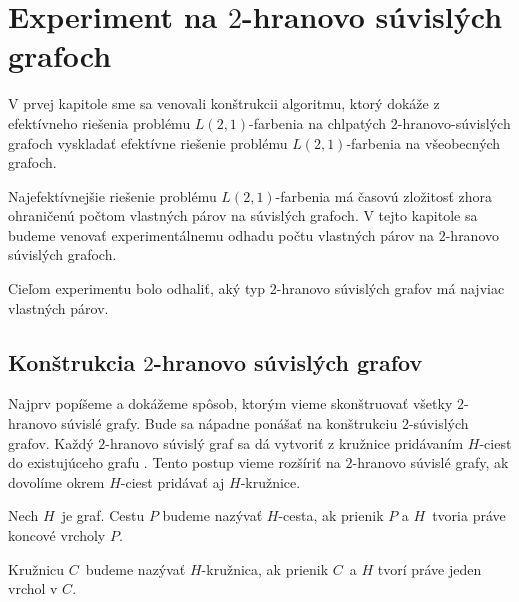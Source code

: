\chapter{Experiment na $2$-hranovo súvislých grafoch}

V prvej kapitole sme sa venovali konštrukcii algoritmu, ktorý dokáže z efektívneho riešenia
problému $L(2,1)$-farbenia na chlpatých $2$-hranovo-súvislých grafoch vyskladať efektívne
riešenie problému $L(2,1)$-farbenia na všeobecných grafoch.

Najefektívnejšie riešenie problému $L(2,1)$-farbenia má časovú zložitosť zhora ohraničenú
počtom vlastných párov na súvislých grafoch. V tejto kapitole sa budeme venovať
experimentálnemu odhadu počtu vlastných párov na $2$-hranovo súvislých grafoch.

Cieľom experimentu bolo odhaliť, aký typ $2$-hranovo súvislých grafov má najviac
vlastných párov.

\section{Konštrukcia $2$-hranovo súvislých grafov}

Najprv popíšeme a dokážeme spôsob, ktorým vieme skonštruovať všetky $2$-hranovo
súvislé grafy. Bude sa nápadne ponášať na konštrukciu $2$-súvislých grafov. Každý
$2$-hranovo súvislý graf sa dá vytvoriť z kružnice pridávaním $H$-ciest do existujúceho
grafu \cite{diestel_graph}. Tento postup vieme rozšíriť na $2$-hranovo súvislé grafy, ak
dovolíme okrem $H$-ciest pridávať aj $H$-kružnice.

\begin{defn}
    Nech $H$ je graf. Cestu $P$ budeme nazývať $H$-cesta, ak prienik $P$ a $H$ tvoria
    práve koncové vrcholy $P$.

    Kružnicu $C$ budeme nazývať $H$-kružnica, ak prienik $C$ a $H$ tvorí
    práve jeden vrchol v $C$.
\end{defn}

